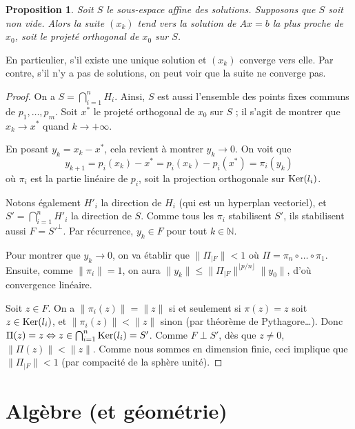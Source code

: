 \documentclass[a4paper, 11pt]{article}
\def\N{\mathbb{N}}
\def\Ker{\textnormal{Ker}}
\newtheorem*{proposition}{Proposition}
\begin{document}
\begin{proposition}
  Soit $S$ le sous-espace affine des solutions. Supposons que $S$ soit non vide.
  Alors la suite $(x_k)$ tend vers la solution de $Ax = b$ la plus proche de
  $x_0$, soit le projeté orthogonal de $x_0$ sur $S$.
\end{proposition}

En particulier, s'il existe une unique solution et $(x_k)$ converge vers elle.
Par contre, s'il n'y a pas de solutions, on peut voir que la suite ne converge
pas.

\begin{proof}
  On a $S = \bigcap_{i=1}^n H_i$. Ainsi, $S$ est aussi l'ensemble des points
  fixes communs de $p_1, \ldots, p_m$. Soit $x^*$ le projeté orthogonal de $x_0$
  sur $S$ ; il s'agit de montrer que $x_k \longrightarrow x^*$ quand $k \to
  +\infty$.

  En posant $y_k = x_k - x^*$, cela revient à montrer $y_k \longrightarrow 0$.
  On voit que
  \[ y_{k+1} = p_i(x_k) - x^* = p_i(x_k) - p_i(x^*) = \pi_i(y_k) \]
  où $\pi_i$ est la partie linéaire de $p_i$, soit la projection orthogonale sur
  $\Ker(l_i)$.

  Notons également $H'_i$ la direction de $H_i$ (qui est un hyperplan
  vectoriel), et $S' = \bigcap_{i=1}^n H'_i$ la direction de $S$. Comme tous les
  $\pi_i$ stabilisent $S'$, ils stabilisent aussi $F = S'^\perp$. Par
  récurrence, $y_k \in F$ pour tout $k \in \N$.

  Pour montrer que $y_k \longrightarrow 0$, on va établir que $\|\Pi_{|F}\| < 1$
  où $\Pi = \pi_n \circ \ldots \circ \pi_1$. Ensuite, comme $\|\pi_i\| = 1$, on
  aura $\|y_k\| \leq \|\Pi_{|F}\|^{\lfloor p/n \rfloor} \|y_0\|$, d'où
  convergence linéaire.

  Soit $z \in F$. On a $\|\pi_i(z)\| = \|z\|$ si et seulement si $\pi(z) = z$
  soit $z \in \Ker(l_i)$, et $\|\pi_i(z)\| < \|z\|$ sinon (par théorème de
  Pythagore…). Donc $\Pi(z) = z \Leftrightarrow z \in \bigcap_{i=1}^n \Ker(l_i)
  = S'$. Comme $F \perp S'$, dès que $z \neq 0$, $\|\Pi(z)\| < \|z\|$. Comme
  nous sommes en dimension finie, ceci implique que $\|\Pi_{|F}\| < 1$ (par
  compacité de la sphère unité).
\end{proof}

\newpage

\section{Algèbre (et géométrie)}
\end{document}
